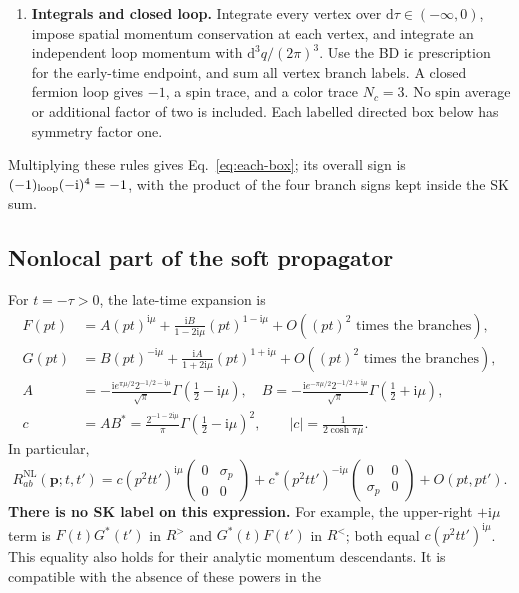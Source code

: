 \documentclass[a4paper,12pt]{article}
\newcommand{\ii}{\mathrm i}
\newcommand{\dd}{\mathrm d}
\newcommand{\NL}{\mathrm{NL}}
\begin{document}
\begin{enumerate}
\item \textbf{Integrals and closed loop.} Integrate every vertex over
$\dd\tau\in(-\infty,0)$, impose spatial momentum conservation at each vertex,
and integrate an independent loop momentum with $\dd^3q/(2\pi)^3$.
Use the BD $\ii\epsilon$ prescription for the early-time endpoint, and sum all vertex branch labels. A closed fermion loop gives $-1$, a spin trace,
and a color trace $N_c=3$. No spin average or additional factor of two is
included. Each labelled directed box below has symmetry factor one.
\end{enumerate}
Multiplying these rules gives Eq.~\eqref{eq:each-box}; its overall sign is
$(-1)_{\rm loop}(-\ii)^4=-1$, with the product of the four branch signs kept
inside the SK sum.

\subsection{Nonlocal part of the soft propagator}
For $t=-\tau>0$, the late-time expansion is
\begin{align}
 F(pt)&=A(pt)^{\ii\mu}+\frac{\ii B}{1-2\ii\mu}(pt)^{1-\ii\mu}+O((pt)^2\text{ times the branches}),\\
 G(pt)&=B(pt)^{-\ii\mu}+\frac{\ii A}{1+2\ii\mu}(pt)^{1+\ii\mu}+O((pt)^2\text{ times the branches}),\\
 A&=-\frac{\ii e^{\pi\mu/2}2^{-1/2-\ii\mu}}{\sqrt\pi}\Gamma(\tfrac12-\ii\mu),\quad
 B=-\frac{\ii e^{-\pi\mu/2}2^{-1/2+\ii\mu}}{\sqrt\pi}\Gamma(\tfrac12+\ii\mu),\\
 c&=AB^*=\frac{2^{-1-2\ii\mu}}\pi\Gamma(\tfrac12-\ii\mu)^2,\qquad |c|=\frac1{2\cosh\pi\mu}.
 \label{eq:late}
\end{align}
In particular,
\begin{equation}
 R^{\NL}_{ab}(\bm p;t,t')=
 c(p^2tt')^{\ii\mu}\begin{pmatrix}0&\sigma_p\\0&0\end{pmatrix}
 +c^*(p^2tt')^{-\ii\mu}\begin{pmatrix}0&0\\\sigma_p&0\end{pmatrix}+O(pt,pt').
 \label{eq:soft-leading}
\end{equation}
\textbf{There is no SK label on this expression.} For example, the upper-right
$+\ii\mu$ term is $F(t)G^*(t')$ in $R^>$ and $G^*(t)F(t')$ in $R^<$;
both equal $c(p^2tt')^{\ii\mu}$. This equality also holds for their analytic
momentum descendants. It is compatible with the absence of these powers in the
\end{document}
